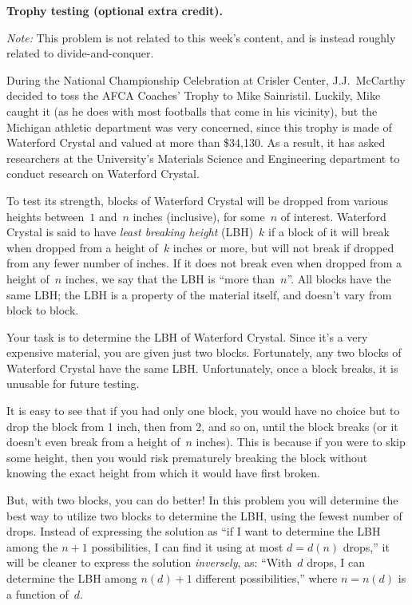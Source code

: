 \documentclass[11pt,addpoints]{exam}
\begin{document}
\begin{questions}
\begin{parts}
    \begin{solution}

    \end{solution}
  \end{parts}


  \bonusquestion \textbf{Trophy testing (optional extra credit).} 

\emph{Note:} This problem is not related to this week's content, and is instead roughly related to divide-and-conquer. 
  
  During the National Championship Celebration at Crisler Center, J.J.\ McCarthy decided to toss the AFCA Coaches' Trophy to Mike Sainristil.
  Luckily, Mike caught it (as he does with most footballs that come in his vicinity), but the Michigan athletic department was very concerned, since this trophy is made of Waterford Crystal and valued at more than \$34,130.
  As a result, it has asked researchers at the University's Materials Science and Engineering department to conduct research on Waterford Crystal.
 
  To test its strength, blocks of Waterford Crystal will be dropped from various heights between~$1$ and~$n$ inches (inclusive), for some~$n$ of interest.
  Waterford Crystal is said to have \emph{least breaking height} (LBH)~$k$ if a block of it will break when dropped from a height of~$k$ inches or more, but will not break if dropped from any fewer number of inches.
  If it does not break even when dropped from a height of~$n$ inches, we say that the LBH is ``more than~$n$''. %
  All blocks have the same LBH; the LBH is a property of the material itself, and doesn't vary from block to block.

  Your task is to determine the LBH of Waterford Crystal.
  Since it's a very expensive material, you are given just two blocks.
  Fortunately, any two blocks of Waterford Crystal have the same LBH\@.
  Unfortunately, once a block breaks, it is unusable for future testing.
 
  It is easy to see that if you had only one block, you would have no choice but to drop the block from 1 inch, then from 2, and so on, until the block breaks (or it doesn't even break from a height of~$n$ inches).
  This is because if you were to skip some height, then you would risk prematurely breaking the block without knowing the exact height from which it would have first broken.

  But, with two blocks, you can do better!
  In this problem you will determine the best way to utilize two blocks to determine the LBH, using the fewest number of drops.
  Instead of expressing the solution as ``if I want to determine the LBH among the $n+1$ possibilities, I can find it using at most $d=d(n)$ drops,'' it will be cleaner to express the solution \emph{inversely}, as: ``With~$d$ drops, I can determine the LBH among $n(d)+1$ different possibilities,'' where $n=n(d)$ is a function of~$d$.


\end{questions}
\end{document}
